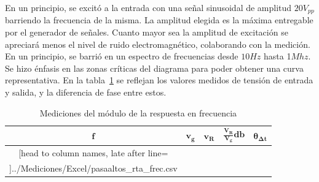 %
%
%		

En un principio, se excitó a la entrada con una señal sinusoidal de amplitud $20V_{pp}$ barriendo la frecuencia de la misma. La amplitud elegida es la máxima entregable por el generador de señales.
 Cuanto mayor sea la amplitud de excitación se apreciará menos el nivel de ruido electromagnético, colaborando con la medición. En un principio, se barrió en un espectro de frecuencias desde $10Hz$ hasta 1$Mhz$.
 Se hizo énfasis en las zonas críticas del diagrama para poder obtener una curva representativa. En la tabla~\ref{table:pasaaltos_rta_frec_table} se reflejan los valores medidos de tensión de entrada y salida, y la diferencia de fase entre estos.

 \begin{table}[H]
 \centering
	\begin{tabular}{c c c c c}
		$\bm{f}$ & $\bm{v_g}$ & $\bm{v_R}$ & $\bm{\frac{V_R}{V_g}db}$ & 
		$\bm{\theta_{\Delta t}}$ \\ \hline
		\csvreader[head to column names, late after line=\\]{../Mediciones/Excel/pasaaltos_rta_frec.csv}{}{\frecuencia & \vin & \vout & \phase}
		\hline
	\end{tabular}
	\label{table:pasaaltos_rta_frec_table}
	\caption{Mediciones del m\'odulo de la respuesta en frecuencia}
\end{table}

